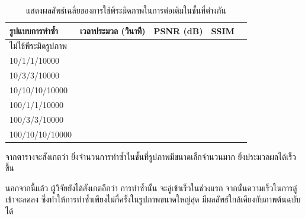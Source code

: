 \documentclass[hidelinks, a4paper,12pt]{article}
\numberwithin{equation}{section}							%
\numberwithin{equation}{section}
\begin{document}
{	\begin{table}[H]
		\centering
		\begin{tabular}[ht]{|l|c|c|c|c|}
			\hline
			รูปแบบการทำซ้ำ  & เวลาประมวล  (วินาที) & PSNR (dB) & SSIM \\
			\hline
			ไม่ใช้พีระมิดรูปภาพ & & & \\
			10/1/1/10000 & & &  \\
			10/3/3/10000 & & & \\
			10/10/10/10000 & & & \\
			100/1/1/10000 & & & \\
			100/3/3/10000 & & & \\
			100/10/10/10000 & & & \\
			\hline
		\end{tabular}
		\caption{แสดงผลลัพธ์เฉลี่ยของการใช้พีระมิดภาพในการต่อเติมในชั้นที่ต่างกัน}
	\end{table}	
	
	จากตารางจะสังเกตว่า ยิ่งจำนวนการทำซ้ำในชั้นที่รูปภาพมีขนาดเล็กจำนวนมาก ยิ่งประมวลผลได้เร็วขึ้น 
	
	นอกจากนี้แล้ว ผู้วิจัยยังได้สังเกตอีกว่า การทำซ้ำนั้น จะลู่เข้าเร็วในช่วงแรก จากนั้นความเร็วในการลู่เข้าจะลดลง ซึ่งทำให้การทำซ้ำเพียงไม่กี่ครั้งในรูปภาพขนาดใหญ่สุด มีผลลัพธ์ใกล้เคียงกับภาพต้นฉบับได้
	
}
\end{document}
